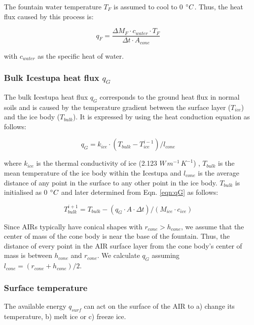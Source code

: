 \documentclass[utf8]{frontiersSCNS}
\begin{document}
The fountain water temperature $T_F$ is assumed to cool to 0 $\degree C$. Thus, the heat flux caused by this
process is:

\begin{equation}
	q_{F} = \frac{ \Delta M_F \cdot c_{water} \cdot T_F}{\Delta t \cdot A_{cone}}
	\label{eqn:qF}
\end{equation}

with $c_{water}$ as the specific heat of water.

\subsubsection{Bulk Icestupa heat flux \texorpdfstring{$q_{G}$}{Lg}} \label{sec:Bulkflux}

The bulk Icestupa heat flux $q_{G}$ corresponds to the ground heat flux in normal soils and is caused by the
temperature gradient between the surface layer ($T_{ice}$) and the ice body ($T_{bulk}$). It is expressed by
using the heat conduction equation as follows:

\begin{equation} q_{G} = k_{ice} \cdot (T_{bulk}-T_{ice}^{i-1})/l_{cone} \label{eqn:qG}    \end{equation}

where $k_{ice}$ is the thermal conductivity of ice (2.123 $W\, m^{-1}\,K^{-1}$) , $T_{bulk}$ is the mean
temperature of the ice body within the Icestupa and $l_{cone}$ is the average distance of any point in the
surface to any other point in the ice body. $T_{bulk}$ is initialised as 0 $\degree C$ and later determined from
Eqn. \ref{eqn:qG} as follows:

\begin{equation} T_{bulk}^{i+1} = T_{bulk} - (q_{G} \cdot A \cdot \Delta t)/(M_{ice} \cdot c_{ice}) \end{equation}

Since AIRs typically have conical shapes with $r_{cone} > h_{cone}$, we assume that the center of mass of the cone
body is near the base of the fountain. Thus, the distance of every point in the AIR surface layer from the cone
body's center of mass is between $h_{cone}$ and $r_{cone}$. We calculate $q_{G}$ assuming $l_{cone} = (r_{cone} +
	h_{cone})/2$.

\subsubsection{Surface temperature}

The available energy $q_{surf}$ can act on the surface of the AIR to a) change its temperature, b) melt ice or
c) freeze ice.
\end{document}
